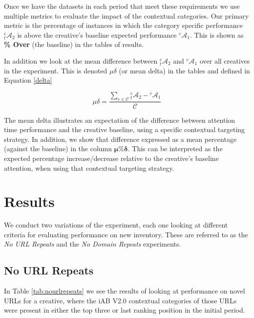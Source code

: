 \documentclass[sigconf]{acmart}
\begin{document}
Once we have the datasets in each period that meet these requirements we use multiple metrics
to evaluate the impact of the contextual categories. Our primary metric is the percentage
of instances in which the category specific performance ${}^c_t\mathcal{A}_2$ is above the
creative's baseline expected performance ${}^c\mathcal{A}_1$.
This is shown as \textbf{\% Over} (the baseline) in the tables of results.

In addition we look at the mean difference between ${}^c_t\mathcal{A}_2$ and ${}^c\mathcal{A}_1$
over all creatives in the experiment. This is denoted \boldmath$\mu\delta$ (or mean delta) in
the tables and defined in Equation \ref{delta}

\begin{equation}
\label{delta}
\mu\delta = \frac{ \sum_{c \in \mathcal{C}} {}^c_t\mathcal{A}_2 - {}^c\mathcal{A}_1 }{ \mathcal{C} }
\end{equation}

The mean delta illustrates an expectation of the difference between attention time performance
and the creative baseline, using a specific contextual targeting strategy. In addition, we show
that difference expressed as a mean percentage (against the baseline) in the column
$\mathbf{\mu\%\delta}$. This can be interpreted as the expected percentage increase/decrease
relative to the creative's baseline attention, when using that contextual targeting strategy.


\section{Results}

We conduct two variations of the experiment, each one looking at different
criteria for evaluating performance on new inventory.
These are referred to as the
\emph{No URL Repeats} and the \emph{No Domain Repeats} experiments.

\subsection{No URL Repeats}

In Table \ref{tab:nourlrepeats} we see the results of looking at performance on novel
URLs for a creative, where the iAB V2.0 contextual categories of those URLs were present
in either the top three or last ranking position in the initial period.
\end{document}
